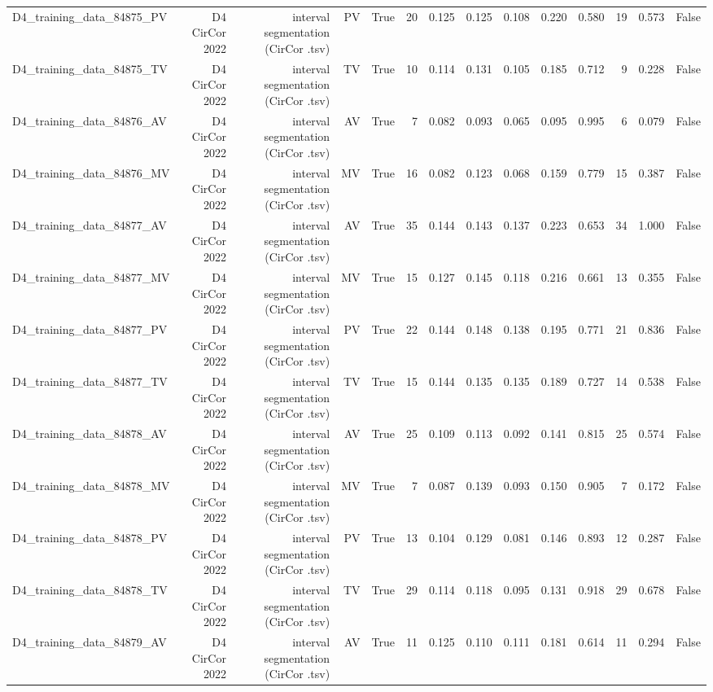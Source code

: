 \begin{table}[htbp]
\begin{tabular}{lrrrrrrrrrrrrr}
    D4\_training\_data\_84875\_PV & D4 CirCor 2022 & interval segmentation (CirCor .tsv) & PV & True & 20 & 0.125 & 0.125 & 0.108 & 0.220 & 0.580 & 19 & 0.573 & False \\
    D4\_training\_data\_84875\_TV & D4 CirCor 2022 & interval segmentation (CirCor .tsv) & TV & True & 10 & 0.114 & 0.131 & 0.105 & 0.185 & 0.712 & 9 & 0.228 & False \\
    D4\_training\_data\_84876\_AV & D4 CirCor 2022 & interval segmentation (CirCor .tsv) & AV & True & 7 & 0.082 & 0.093 & 0.065 & 0.095 & 0.995 & 6 & 0.079 & False \\
    D4\_training\_data\_84876\_MV & D4 CirCor 2022 & interval segmentation (CirCor .tsv) & MV & True & 16 & 0.082 & 0.123 & 0.068 & 0.159 & 0.779 & 15 & 0.387 & False \\
    D4\_training\_data\_84877\_AV & D4 CirCor 2022 & interval segmentation (CirCor .tsv) & AV & True & 35 & 0.144 & 0.143 & 0.137 & 0.223 & 0.653 & 34 & 1.000 & False \\
    D4\_training\_data\_84877\_MV & D4 CirCor 2022 & interval segmentation (CirCor .tsv) & MV & True & 15 & 0.127 & 0.145 & 0.118 & 0.216 & 0.661 & 13 & 0.355 & False \\
    D4\_training\_data\_84877\_PV & D4 CirCor 2022 & interval segmentation (CirCor .tsv) & PV & True & 22 & 0.144 & 0.148 & 0.138 & 0.195 & 0.771 & 21 & 0.836 & False \\
    D4\_training\_data\_84877\_TV & D4 CirCor 2022 & interval segmentation (CirCor .tsv) & TV & True & 15 & 0.144 & 0.135 & 0.135 & 0.189 & 0.727 & 14 & 0.538 & False \\
    D4\_training\_data\_84878\_AV & D4 CirCor 2022 & interval segmentation (CirCor .tsv) & AV & True & 25 & 0.109 & 0.113 & 0.092 & 0.141 & 0.815 & 25 & 0.574 & False \\
    D4\_training\_data\_84878\_MV & D4 CirCor 2022 & interval segmentation (CirCor .tsv) & MV & True & 7 & 0.087 & 0.139 & 0.093 & 0.150 & 0.905 & 7 & 0.172 & False \\
    D4\_training\_data\_84878\_PV & D4 CirCor 2022 & interval segmentation (CirCor .tsv) & PV & True & 13 & 0.104 & 0.129 & 0.081 & 0.146 & 0.893 & 12 & 0.287 & False \\
    D4\_training\_data\_84878\_TV & D4 CirCor 2022 & interval segmentation (CirCor .tsv) & TV & True & 29 & 0.114 & 0.118 & 0.095 & 0.131 & 0.918 & 29 & 0.678 & False \\
    D4\_training\_data\_84879\_AV & D4 CirCor 2022 & interval segmentation (CirCor .tsv) & AV & True & 11 & 0.125 & 0.110 & 0.111 & 0.181 & 0.614 & 11 & 0.294 & False \\

\end{tabular}
\end{table}
